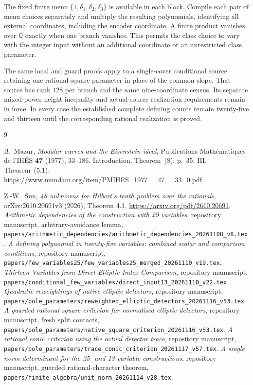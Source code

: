 \documentclass[11pt,a4paper]{article}
\newcommand{\Q}{\mathbb Q}\newcommand{\Z}{\mathbb Z}
\begin{document}
The fixed finite menu $\{1,\delta_1,\delta_2,\delta_3\}$ is
available in each block. Compile each pair of menu choices separately
and multiply the resulting polynomials, identifying all external
coordinates, including the encoder coordinate. A finite product
vanishes over $\Q$ exactly when one branch vanishes. This permits
the class choice to vary with the integer input without an additional
coordinate or an unrestricted class parameter.

The same local and guard proofs apply to a single-cover conditional
source retaining one rational square parameter in place of the common
slope. That source has rank $128$ per branch and the same nine-coordinate
census. Its separate mixed-power height inequality and actual-source
realization requirements remain in force. In every case the established
complete defining counts remain twenty-five and thirteen until the
corresponding rational realization is proved.

\begin{thebibliography}{9}\raggedright
{}
B.~Mazur, \emph{Modular curves and the Eisenstein ideal},
Publications Math\'ematiques de l'IH\'ES \textbf{47} (1977),
33--186, Introduction, Theorem~(8), p.~35; III, Theorem~(5.1).
\url{https://www.numdam.org/item/PMIHES_1977__47__33_0.pdf}.

Z.-W.~Sun,
\emph{48 unknowns for Hilbert's tenth problem over the rationals},
arXiv:2610.20691v3 (2026), Theorem 4.1,
\url{https://arxiv.org/pdf/2610.20691}.
\emph{Arithmetic dependencies of the construction
with 29 variables}, repository manuscript, arbitrary-avoidance lemma,
\nolinkurl{papers/arithmetic_dependencies/arithmetic_dependencies_20261108_v8.tex}.
\emph{A defining polynomial in twenty-five variables:
combined scalar and comparison conditions}, repository manuscript,
\nolinkurl{papers/few_variables25/few_variables25_merged_20261110_v19.tex}.
\emph{Thirteen Variables from Direct Elliptic
Index Comparison}, repository manuscript,
\nolinkurl{papers/conditional_few_variables/direct_input13_20261110_v22.tex}.
\emph{Quadratic reweightings of native elliptic
detectors}, repository manuscript,
\nolinkurl{papers/pole_parameters/reweighted_elliptic_detectors_20261116_v53.tex}.
\emph{A guarded rational-square criterion for normalized
elliptic detectors}, repository manuscript, fresh split contacts,
\nolinkurl{papers/pole_parameters/native_square_criterion_20261116_v53.tex}.
\emph{A rational conic criterion using the actual detector
trace}, repository manuscript,
\nolinkurl{papers/pole_parameters/trace_conic_criterion_20261117_v57.tex}.
\emph{A single norm determinant for the 25- and 13-variable
constructions}, repository manuscript, guarded rational-character theorem,
\nolinkurl{papers/finite_algebra/unit_norm_20261114_v28.tex}.
\end{thebibliography}
\end{document}
